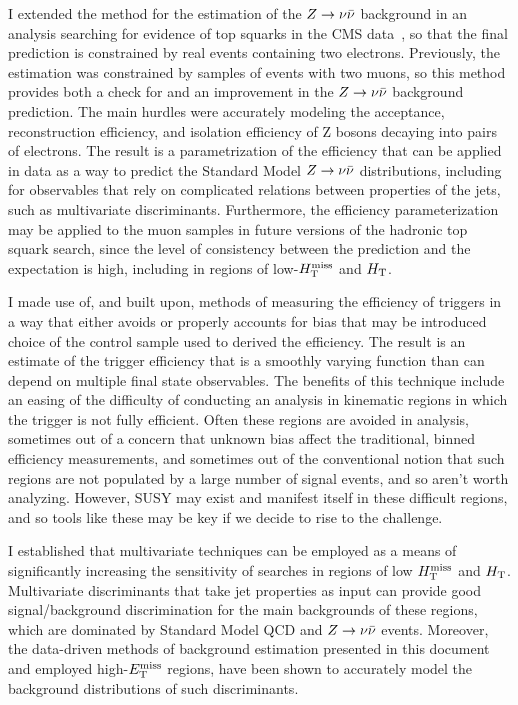 I extended the method for the estimation of the $Z\rightarrow \nu\bar{\nu}$ background in an analysis searching for evidence of top squarks in the CMS data~\cite{CMS:2016nhb}, so that the final prediction is constrained by real events containing two electrons. Previously, the estimation was constrained by samples of events with two muons, so this method provides both a check for and an improvement in the $Z\rightarrow \nu\bar{\nu}$ background prediction. The main hurdles were accurately modeling the acceptance, reconstruction efficiency, and isolation efficiency of Z bosons decaying into pairs of electrons. The result is a parametrization of the efficiency that can be applied in data as a way to predict the Standard Model $Z\rightarrow \nu\bar{\nu}$ distributions, including for observables that rely on complicated relations between properties of the jets, such as multivariate discriminants. Furthermore, the efficiency parameterization may be applied to the muon samples in future versions of the hadronic top squark search, since the level of consistency between the prediction and the expectation is high, including in regions of low-$H_{\text{T}}^{\rm miss}$ and $H_{\rm T}$.

I made use of, and built upon, methods of measuring the efficiency of triggers in a way that either avoids or properly accounts for bias that may be introduced choice of the control sample used to derived the efficiency. The result is an estimate of the trigger efficiency that is a smoothly varying function than can depend on multiple final state observables.  The benefits of this technique include an easing of the difficulty of conducting an analysis in kinematic regions in which the trigger is not fully efficient. Often these regions are avoided in analysis, sometimes out of a concern that unknown bias affect the traditional, binned efficiency measurements, and sometimes out of the conventional notion that such regions are not populated by a large number of signal events, and so aren't worth analyzing. However, SUSY may exist and manifest itself in these difficult regions, and so tools like these may be key if we decide to rise to the challenge.

I established that multivariate techniques can be employed as a means of significantly increasing the sensitivity of searches in regions of low $H_{\text{T}}^{\rm miss}$ and $H_{\rm T}$. Multivariate discriminants that take jet properties as input can provide good signal/background discrimination for the main backgrounds of these regions, which are dominated by Standard Model QCD and $Z\rightarrow \nu\bar{\nu}$ events. Moreover, the data-driven methods of background estimation presented in this document and employed high-$E_{\text{T}}^{\rm miss}$ regions, have been shown to accurately model the background distributions of such discriminants.

